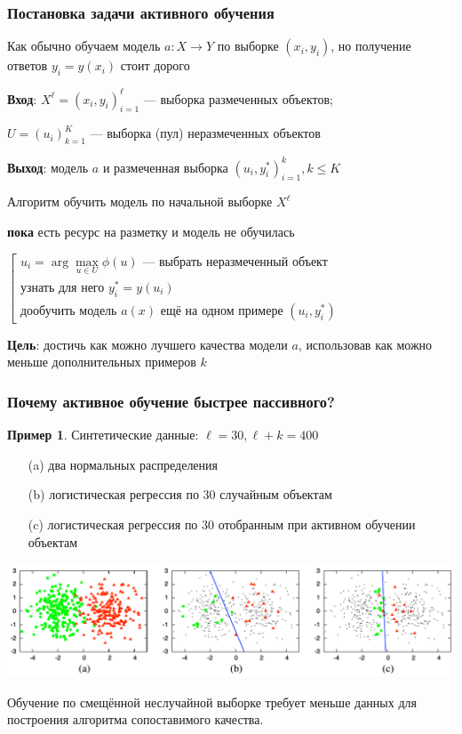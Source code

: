 \documentclass[fullscreen=true, bookmarks=true, hyperref={pdfencoding=unicode}]{beamer}
\begin{document}
\begin{frame}
  \frametitle{Постановка задачи активного обучения}

  Как обычно обучаем модель $a: X \to Y$ по выборке $(x_i, y_i)$, но получение ответов $y_i = y(x_i)$ стоит дорого

  \vspace{0.5cm}
  {\bf Вход}: $X^\ell = (x_i, y_i)_{i=1}^\ell$ — выборка размеченных объектов;

    $U = (u_i)_{k=1}^K$ — выборка (пул) неразмеченных объектов

  {\bf Выход}: модель $a$ и размеченная выборка $(u_i, y_i^*)_{i=1}^k, k \leq K$

  \begin{block}{Алгоритм}
    обучить модель по начальной выборке $X^\ell$

    {\bf пока} есть ресурс на разметку и модель не обучилась

    $
    \left[
    \begin{array}{l}
      u_i = \arg\max\limits_{u \in U} \phi(u) \text{ — выбрать неразмеченный объект} \\
      \text{узнать для него } y_i^* = y(u_i) \\
      \text{дообучить модель } a(x) \text{ ещё на одном примере } (u_i, y_i^*)
    \end{array}
    \right.
    $
  \end{block}

  {\bf Цель}: достичь как можно лучшего качества модели $a$, использовав как можно меньше дополнительных примеров $k$
\end{frame}


\begin{frame}
  \frametitle{Почему активное обучение быстрее пассивного?}

  \pause
  {\bf Пример 1}. Синтетические данные: $\ell = 30, \ell + k = 400$

  \begin{itemize}
    \item[(a)] два нормальных распределения
    \item[(b)] логистическая регрессия по 30 случайным объектам
    \item[(c)] логистическая регрессия по 30 отобранным при активном обучении объектам
  \end{itemize}

  \begin{center}
    \includegraphics[keepaspectratio,
                     width=.8\paperwidth]{active_learning_LR.png}
  \end{center}

  Обучение по смещённой неслучайной выборке требует меньше данных для построения алгоритма сопоставимого качества.

\end{frame}
\end{document}
